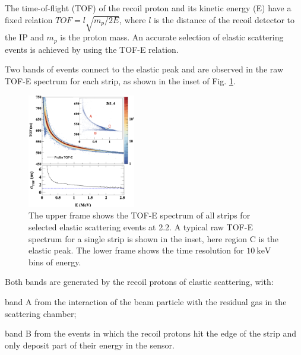 \documentclass[number,5p]{elsarticle}
\begin{document}
The time-of-flight (TOF) of the recoil proton and its kinetic energy (E)
have a fixed relation $TOF = l\sqrt{m_p/2E}$, where $l$ is the distance of
the recoil detector to the IP and $m_p$ is the proton mass.
An accurate selection of elastic scattering events is achieved by using the TOF-E relation.

Two bands of events connect to the elastic peak and are observed in the raw TOF-E spectrum for each strip, as shown in the inset of Fig. \ref{fig:tof-e}.
\begin{figure}[b!]
  \centering
  \includegraphics[width=0.42\textwidth]{./tofe_tsigma.png}
  \caption{
    The upper frame shows the TOF-E spectrum of all strips for selected elastic
    scattering events at \SI{2.2}{\momentum}.
    A typical raw TOF-E spectrum for a single strip is shown in the inset, here region C is the elastic peak.
    The lower frame shows the time resolution for $\SI{10}{\keV}$ bins of energy.
  }
  \label{fig:tof-e}
\end{figure}
Both bands are generated by the recoil protons of elastic scattering, with:
\begin{enumerate*}[label=(\roman*)]
\item band A from the interaction of the beam particle with the residual gas in the scattering chamber;
\item band B from the events in which the recoil protons hit the edge of the strip and only deposit part of their energy in the sensor.
\end{enumerate*}
\end{document}
